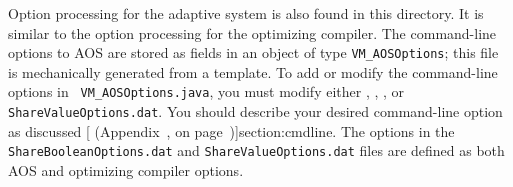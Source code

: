 %
%
Option processing for the adaptive system is also found in this
directory.  It is similar to the option processing for the optimizing
compiler.  The command-line options to AOS are
stored as fields in an object of type {\tt VM\_AOSOptions}; this file
is mechanically generated from a template.
To add or modify the command-line options in {\tt
VM\_AOSOptions.java}, you must modify either ,
, , or {\tt
Share\-Val\-ue\-Op\-tions\-.dat}.  You should describe your desired command-line
option as discussed [ (Appendix~\Ref, on page~\Pageref)]{section:cmdline}.  The options in the {\tt
ShareBooleanOptions.dat} and {\tt ShareValueOptions.dat} files are
defined as both AOS and optimizing compiler options.


